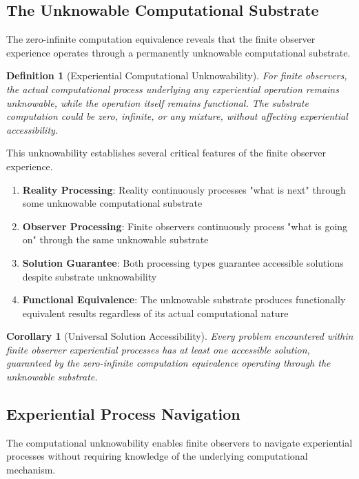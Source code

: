 \documentclass{article}
\newtheorem{corollary}[theorem]{Corollary}
\newtheorem{definition}[theorem]{Definition}
\begin{document}
\subsection{The Unknowable Computational Substrate}

The zero-infinite computation equivalence reveals that the finite observer experience operates through a permanently unknowable computational substrate.

\begin{definition}[Experiential Computational Unknowability]
For finite observers, the actual computational process underlying any experiential operation remains unknowable, while the operation itself remains functional. The substrate computation could be zero, infinite, or any mixture, without affecting experiential accessibility.
\end{definition}

This unknowability establishes several critical features of the finite observer experience.

\begin{enumerate}
\item \textbf{Reality Processing}: Reality continuously processes "what is next" through some unknowable computational substrate
\item \textbf{Observer Processing}: Finite observers continuously process "what is going on" through the same unknowable substrate  
\item \textbf{Solution Guarantee}: Both processing types guarantee accessible solutions despite substrate unknowability
\item \textbf{Functional Equivalence}: The unknowable substrate produces functionally equivalent results regardless of its actual computational nature
\end{enumerate}

\begin{corollary}[Universal Solution Accessibility]
Every problem encountered within finite observer experiential processes has at least one accessible solution, guaranteed by the zero-infinite computation equivalence operating through the unknowable substrate.
\end{corollary}

\subsection{Experiential Process Navigation}

The computational unknowability enables finite observers to navigate experiential processes without requiring knowledge of the underlying computational mechanism.
\end{document}
